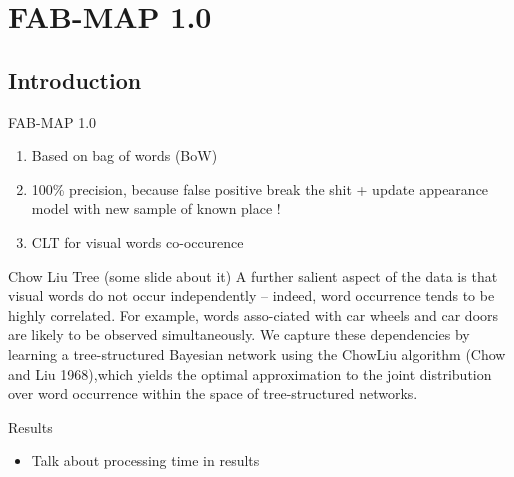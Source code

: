 \section{FAB-MAP 1.0}

\subsection{Introduction}
\begin{frame}{FAB-MAP 1.0}
    \begin{enumerate}
        \item Based on bag of words (BoW)
        \item 100\% precision, because false positive break the shit + update appearance model with new sample of known place !
        \item CLT for visual words co-occurence
    \end{enumerate}
    \note[item]{}
\end{frame}

\begin{frame}{Chow Liu Tree (some slide about it)}
    A further salient aspect of the data is that visual words do not occur independently – indeed, word occurrence tends to be highly correlated. For example, words asso-ciated with car wheels and car doors are likely to be observed simultaneously. We capture these dependencies by learning a tree-structured Bayesian network using the ChowLiu algorithm (Chow and Liu 1968),which yields the optimal approximation to the joint distribution over word occurrence within the space of tree-structured networks.
\end{frame}

\begin{frame}{Results}
    \begin{itemize}
        \item Talk about processing time in results
    \end{itemize}
\end{frame}

